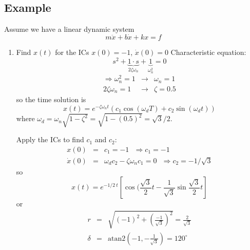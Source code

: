 \documentclass[]{article}
\begin{document}
\begin{enumerate}
\begin{tikzpicture}
\end{tikzpicture}
\end{enumerate}

\subsection{Example}
Assume we have a linear dynamic system
\begin{displaymath}
 m\ddot{x}+b\dot{x}+kx=f
\end{displaymath}
\begin{enumerate}
 \item Find $x(t)$ for the ICs $x(0)=-1$, $\dot{x}(0)=0$
 Characteristic equation:
 \begin{displaymath}
s^{2}+\underbrace{1\cdot s}_{2\zeta\omega_{n}} + \underbrace{1}_{\omega_{n}^{2}} = 0
 \end{displaymath}
\begin{eqnarray}
 \Rightarrow \omega_{n}^{2} = 1 & \rightarrow & \omega_{n}=1 \nonumber \\
 2\zeta\omega_{n} = 1 & \rightarrow & \zeta=0.5 \nonumber
\end{eqnarray}
so the time solution is
\begin{displaymath}
 x(t) = e^{-\zeta\omega_{n}t}\left(c_{1}\cos(\omega_{d}T) + c_{2}\sin(\omega_{d}t)\right)
\end{displaymath}
where $\omega_{d}=\omega_{n}\sqrt{1-\zeta^{2}} = \sqrt{1-(0.5)^{2}} = \sqrt{3}/2$.

Apply the ICs to find $c_{1}$ and $c_{2}$:
\begin{eqnarray}
 x(0) & = & c_{1} = -1\ \ \ \Rightarrow c_{1}=-1 \nonumber  \\
 \dot{x}(0) & = & \omega_{d}c_{2}-\zeta\omega_{n}c_{1} = 0 \ \ \ \Rightarrow c_{2}=-1/\sqrt{3} \nonumber
\end{eqnarray}
so
\begin{displaymath}
 x(t) = e^{-1/2\ t}\left[\cos(\frac{\sqrt{3}}{2}t - \frac{1}{\sqrt{3}}\sin{\frac{\sqrt{3}}{2}t}\right]
\end{displaymath}
or
\begin{eqnarray}
 r & = & \sqrt{(-1)^{2}+(\frac{-1}{\sqrt{3}})^{2}} = \frac{2}{\sqrt{3}} \nonumber \\
 \delta & = & \text{atan2}\left(-1, -\frac{1}{\sqrt{3}}\right) = 120^{\circ} \nonumber
\end{eqnarray}


\end{enumerate}
\end{document}

